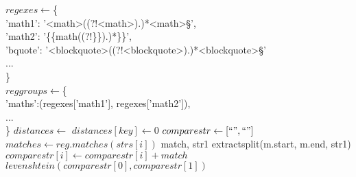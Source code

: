 \begin{algorithmic}
  $regexes \gets $\{\\
    'math1': '<math>((?!<\/math>).)*<\/math>\S',\\
    'math2': '\{\{math((?!\}\}).)*\}\}',\\
    'bquote': '<blockquote>((?!<\/blockquote>).)*<\/blockquote>\S'\\
    ...\\
  \}\\
  $reggroups \gets $\{\\
    'maths':(regexes['math1'], regexes['math2']),\\
    ...\\
  \}
  $distances \gets {}$
  $distances[key] \gets 0$
  $comparestr \gets [``", ``"]$
  $matches \gets reg.matches(strs[i])$
  match, str1 \gets extractsplit(m.start, m.end, str1)
  $comparestr[i] \gets comparestr[i] + match$
  \EndFor
  \EndFor
  \State $levenshtein(comparestr[0], comparestr[1])$
  \EndIf
  \EndFor
\end{algorithmic}
